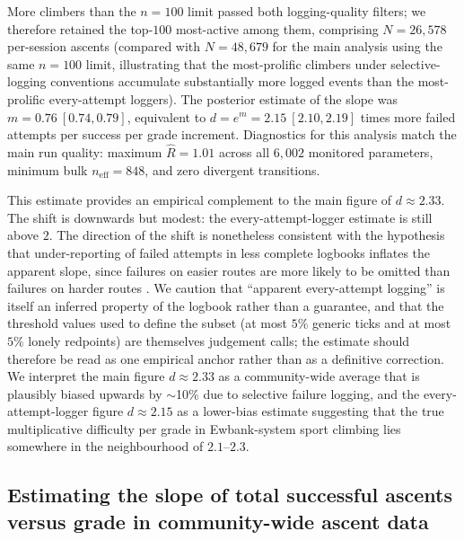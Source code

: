\documentclass[12pt]{article}
\begin{document}
More climbers than the $n=100$ limit passed both logging-quality filters; we therefore retained the top-$100$ most-active among them, comprising $N = 26{,}578$ per-session ascents (compared with $N=48{,}679$ for the main analysis using the same $n=100$ limit, illustrating that the most-prolific climbers under selective-logging conventions accumulate substantially more logged events than the most-prolific every-attempt loggers). The posterior estimate of the slope was $m = 0.76\ [0.74, 0.79]$, equivalent to $d = e^m = 2.15\ [2.10, 2.19]$ times more failed attempts per success per grade increment. Diagnostics for this analysis match the main run quality: maximum $\hat{R} = 1.01$ across all $6{,}002$ monitored parameters, minimum bulk $n_{\mathrm{eff}} = 848$, and zero divergent transitions.

This estimate provides an empirical complement to the main figure of $d \approx 2.33$. The shift is downwards but modest: the every-attempt-logger estimate is still above $2$. The direction of the shift is nonetheless consistent with the hypothesis that under-reporting of failed attempts in less complete logbooks inflates the apparent slope, since failures on easier routes are more likely to be omitted than failures on harder routes \citep{scarff2020estimation}. We caution that ``apparent every-attempt logging'' is itself an inferred property of the logbook rather than a guarantee, and that the threshold values used to define the subset (at most $5\%$ generic ticks and at most $5\%$ lonely redpoints) are themselves judgement calls; the estimate should therefore be read as one empirical anchor rather than as a definitive correction. We interpret the main figure $d \approx 2.33$ as a community-wide average that is plausibly biased upwards by $\sim$10\% due to selective failure logging, and the every-attempt-logger figure $d \approx 2.15$ as a lower-bias estimate suggesting that the true multiplicative difficulty per grade in Ewbank-system sport climbing lies somewhere in the neighbourhood of $2.1$--$2.3$.

\subsection{Estimating the slope of total successful ascents versus grade in community-wide ascent data}
\end{document}
